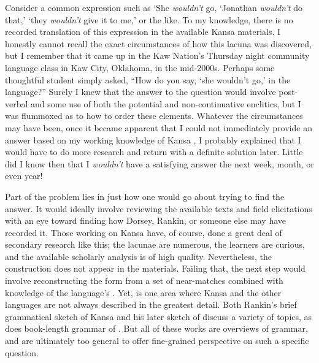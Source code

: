 \documentclass[output=paper]{LSP/langsci}
\begin{document}
\largerpage[-1] 
Consider a common  expression such as `She \textit{wouldn't} go, %
`Jonathan 
\textit{wouldn't} do that,' `they \textit{wouldn't} give it to me,' or the like. To my knowledge, there is no recorded translation of this expression in the available Kansa materials. I honestly cannot recall the exact circumstances of how this lacuna was discovered, but I remember that it came up in the Kaw Nation's Thursday night community language class in Kaw City, Oklahoma, in the mid-2000s. Perhaps some thoughtful student simply asked, ``How do you say, `she wouldn't go,' in the language?'' Surely I knew that the answer to the question would involve post-verbal  and some use of both the potential and non-continuative enclitics, but I was flummoxed as to how to order these elements. Whatever the circumstances may have been, once it became apparent that I could not immediately provide an answer based on my working knowledge of Kansa , I probably explained that I would have to do more research and return with a definite solution later. Little did I know then that I \textit{wouldn't} have a satisfying answer the next week, month, or even year!

Part of the problem lies in just how one would go about trying to find the answer. It would ideally involve reviewing the available texts and field elicitations with an eye toward finding how Dorsey, Rankin, or someone else may have recorded it. Those working on Kansa have, of course, done a great deal of secondary research like this; the lacunae are numerous, the learners are curious, and the available scholarly analysis is of high quality. Nevertheless, the construction does not appear in the materials. Failing that, the next step would involve reconstructing the form from a set of near-matches combined with knowledge of the language's . Yet,  is one area where Kansa and the other  languages are not always described in the greatest detail. Both Rankin's brief grammatical sketch of Kansa \citeyear{Rankin1989} and his later sketch of  \citeyear{Rankin2005b} discuss a variety of  topics, as does  book-length grammar of . But all of these works are overviews of  grammar, and are ultimately too general to offer fine-grained perspective on such a specific question. 
\end{document}
